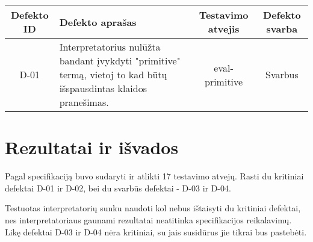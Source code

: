 \documentclass{VUMIFPSkursinis}
\begin{document}
\begin{table}[H]\footnotesize
  \centering
  {\begin{tabular}{|c|l|c|c|} \hline
    Defekto ID & Defekto aprašas & Testavimo atvejis & Defekto svarba  \\
    \hline
    D-01 & Interpretatorius nulūžta bandant įvykdyti "primitive" termą, vietoj to kad būtų išspausdintas klaidos pranešimas. & eval-primitive & Svarbus \\
    \hline
  \end{tabular}}
  \label{tab:table example}
\end{table}


\section{Rezultatai ir išvados}

Pagal specifikaciją buvo sudaryti ir atlikti 17 testavimo atvejų. Rasti du kritiniai defektai D-01 ir D-02, bei du svarbūs defektai - D-03 ir D-04.

Testuotas interpretatorių sunku naudoti kol nebus ištaisyti du kritiniai defektai, nes interpretatoriaus gaunami rezultatai neatitinka specifikacijos reikalavimų. Likę defektai D-03 ir D-04 nėra kritiniai, su jais susidūrus jie tikrai bus pastebėti.


\printbibliography[heading=bibintoc, title=Šaltiniai]  %

\appendix  %
\end{document}

